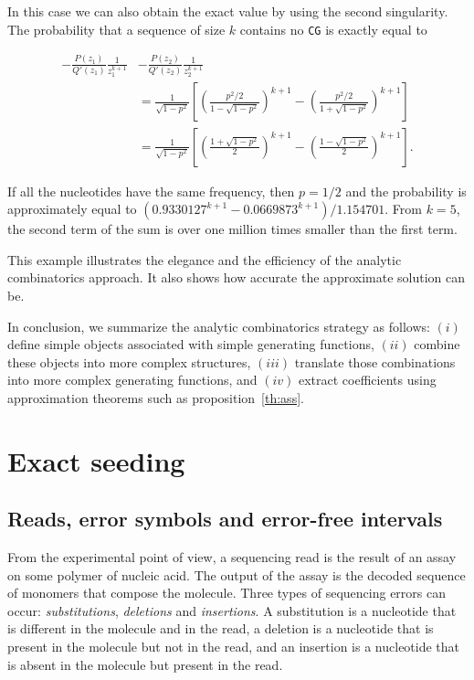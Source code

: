 \documentclass{article}
\begin{document}
In this case we can also obtain the exact value by using the second
singularity. The probability that a sequence of size $k$ contains no
\texttt{CG} is exactly equal to

\begin{equation*}
\begin{split}
-\frac{P(z_1)}{Q'(z_1)}\frac{1}{z_1^{k+1}}
&-\frac{P(z_2)}{Q'(z_2)}\frac{1}{z_2^{k+1}} \\
&=
\frac{1}{\sqrt{1-p^2}} \left[
\left( \frac{p^2/2}{1-\sqrt{1-p^2}} \right)^{k+1}
- \left( \frac{p^2/2}{1+\sqrt{1-p^2}} \right)^{k+1}\right] \\
&= \frac{1}{\sqrt{1-p^2}} \left[
\left(\frac{1+\sqrt{1-p^2}}{2} \right)^{k+1} -
\left(\frac{1-\sqrt{1-p^2}}{2} \right)^{k+1} \right].
\end{split}
\end{equation*}

If all the nucleotides have the same frequency, then $p=1/2$ and the
probability is approximately equal to $(0.9330127^{k+1} - 0.0669873^{k+1})
/ 1.154701$. From $k=5$, the second term of the sum is over one million
times smaller than the first term.

This example illustrates the elegance and the efficiency of the analytic
combinatorics approach. It also shows how accurate the approximate
solution can be.

In conclusion, we summarize the analytic combinatorics strategy as
follows: $(i)$ define simple objects associated with simple generating
functions, $(ii)$ combine these objects into more complex structures,
$(iii)$ translate those combinations into more complex generating
functions, and $(iv)$ extract coefficients using approximation theorems
such as proposition~\ref{th:ass}.











\section{Exact seeding}
\label{sec:seeding}

\subsection{Reads, error symbols and error-free intervals}

From the experimental point of view, a sequencing read is the result of an
assay on some polymer of nucleic acid. The output of the assay is the
decoded sequence of monomers that compose the molecule. Three types of
sequencing errors can occur: \emph{substitutions}, \emph{deletions} and
\emph{insertions}. A substitution is a nucleotide that is different in the
molecule and in the read, a deletion is a nucleotide that is present in
the molecule but not in the read, and an insertion is a nucleotide that is
absent in the molecule but present in the read.
\end{document}
